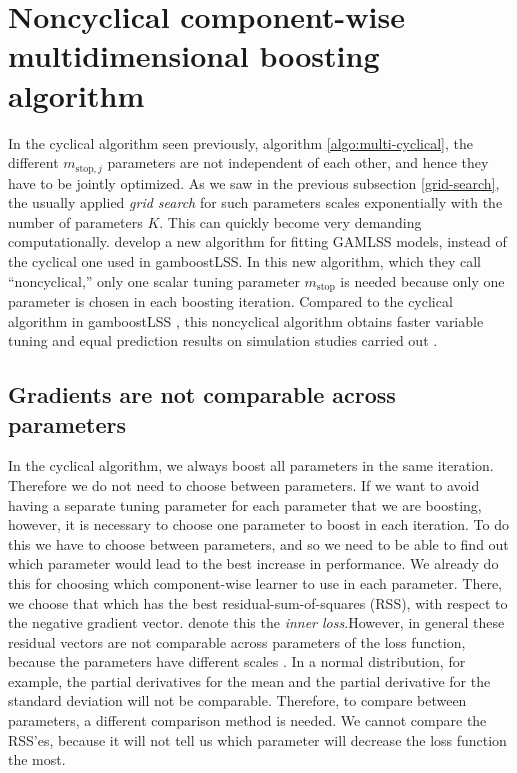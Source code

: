 \section{Noncyclical component-wise multidimensional boosting algorithm}
In the cyclical algorithm seen previously, algorithm \ref{algo:multi-cyclical}, the different $m_{\text{stop},j}$ parameters are not independent of each other, and hence they have to be jointly optimized. As we saw in the previous subsection \ref{grid-search}, the usually applied \textit{grid search} for such parameters scales exponentially with the number of parameters $K$. This can quickly become very demanding computationally. \citet{thomas2018} develop a new algorithm for fitting GAMLSS models, instead of the cyclical one used in gamboostLSS. In this new algorithm, which they call ``noncyclical,'' only one scalar tuning parameter $m_{\text{stop}}$ is needed because only one parameter is chosen in each boosting iteration. Compared to the cyclical algorithm in gamboostLSS \citep{gamboostlss-paper}, this noncyclical algorithm obtains faster variable tuning and equal prediction results on simulation studies carried out \citep{thomas2018}.

\subsection{Gradients are not comparable across parameters}
In the cyclical algorithm, we always boost all parameters in the same iteration. Therefore we do not need to choose between parameters. If we want to avoid having a separate tuning parameter for each parameter that we are boosting, however, it is necessary to choose one parameter to boost in each iteration. To do this we have to choose between parameters, and so we need to be able to find out which parameter would lead to the best increase in performance. We already do this for choosing which component-wise learner to use in each parameter. There, we choose that which has the best residual-sum-of-squares (RSS), with respect to the negative gradient vector. \citet{thomas2018} denote this the \textit{inner loss}.However, in general these residual vectors are not comparable across parameters of the loss function, because the parameters have different scales \citep{thomas2018}. In a normal distribution, for example, the partial derivatives for the mean and the partial derivative for the standard deviation will not be comparable. Therefore, to compare between parameters, a different comparison method is needed. We cannot compare the RSS'es, because it will not tell us which parameter will decrease the loss function the most.

